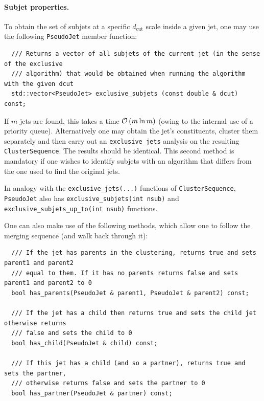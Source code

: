 \documentclass[12pt,a4]{article}
\newcommand{\ttt}[1]{{\small\texttt{#1}}}
\newcommand{\order}[1]{{\cal O}\left(#1\right)}
\newcommand{\PseudoJet}{\ttt{PseudoJet}\xspace}
\newcommand{\PJ}{\ttt{PseudoJet}\xspace}
\newcommand{\CS}{\ttt{ClusterSequence}\xspace}
\begin{document}
\paragraph{Subjet properties.} To obtain the set of subjets at a specific
$d_{\mathrm{cut}}$ scale inside a given jet, one may use the following
\PseudoJet member function:
\begin{lstlisting}
  /// Returns a vector of all subjets of the current jet (in the sense of the exclusive 
  /// algorithm) that would be obtained when running the algorithm with the given dcut
  std::vector<PseudoJet> exclusive_subjets (const double & dcut) const;
\end{lstlisting}
If $m$ jets are found, this takes a time $\order{m \ln m}$ (owing to
the internal use of a priority queue). Alternatively one may obtain
the jet's constituents, cluster them separately and then carry out an
\ttt{exclusive\_jets} analysis on the resulting \ttt{ClusterSequence}.
The results should be identical. This second method is mandatory if
one wishes to identify subjets with an algorithm that differs from the
one used to find the original jets.
%

In analogy with the \ttt{exclusive\_jets(...)} functions of \CS, \PJ
also has \ttt{exclusive\_subjets(int nsub)} and
\ttt{exclusive\_subjets\_up\_to(int nsub)} functions.


One can also make use of the following methods, which allow one to
follow the merging sequence (and walk back through it):
\begin{lstlisting}
  /// If the jet has parents in the clustering, returns true and sets parent1 and parent2 
  /// equal to them. If it has no parents returns false and sets parent1 and parent2 to 0
  bool has_parents(PseudoJet & parent1, PseudoJet & parent2) const;

  /// If the jet has a child then returns true and sets the child jet otherwise returns 
  /// false and sets the child to 0
  bool has_child(PseudoJet & child) const;

  /// If this jet has a child (and so a partner), returns true and sets the partner, 
  /// otherwise returns false and sets the partner to 0
  bool has_partner(PseudoJet & partner) const;
\end{lstlisting}
\end{document}
